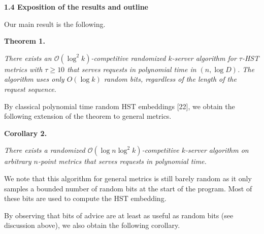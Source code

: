 \documentclass[10pt,a4paper]{article}
\begin{document}
\par\medskip\noindent\textbf{
1.4 Exposition of the results and outline}\par




Our main result is the following.\par






\par\medskip\noindent\textbf{
\textbf{Theorem 1}\textbf{.}
}\par



\emph{There exists an $\mathcal{O}(\log^{2}k)$-competitive randomized $k$-server algorithm for $\tau$-HST metrics with $\tau\geq 10$ that serves requests in polynomial time in $(n,\log D)$. The algorithm uses only $O(\log k)$ random bits, regardless of the length of the request sequence.}\par







By classical polynomial time random HST embeddings [22], we obtain the following extension of the theorem to general metrics.\par





\par\medskip\noindent\textbf{
\textbf{Corollary 2}\textbf{.}
}\par



\emph{There exists a randomized $\mathcal{O}(\log n\log^{2}k)$-competitive $k$-server algorithm on arbitrary $n$-point metrics that serves requests in polynomial time.}\par






We note that this algorithm for general metrics is still barely random as it only samples a bounded number of random bits at the start of the program. Most of these bits are used to compute the HST embedding.\par




By observing that bits of advice are at least as useful as random bits (see discussion above), we also obtain the following corollary.\par
\end{document}
